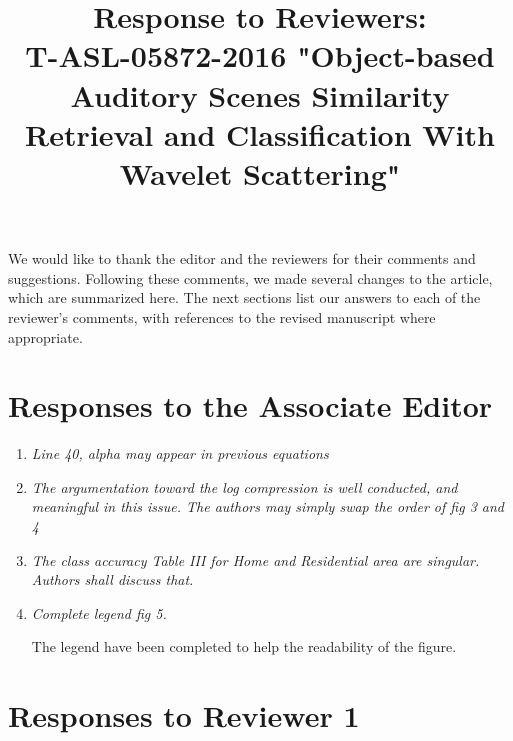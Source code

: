 \documentclass[10pt]{article}
\title{Response to Reviewers: \\ T-ASL-05872-2016 "Object-based Auditory Scenes Similarity Retrieval and Classification With Wavelet Scattering"}
\begin{document}
\maketitle

We would like to thank the editor and the reviewers for their comments and suggestions. Following these comments, we made several changes to the article, which are summarized here. The next sections list our answers to each of the reviewer's comments, with references to the revised manuscript where appropriate.

\section{Responses to the Associate Editor}

\begin{enumerate}

\item \emph{Line 40, alpha may appear in previous equations}

\item \emph{The argumentation toward the log compression is well conducted, and meaningful in this issue. The authors may simply swap the order of fig 3 and 4}

\item \emph{The class accuracy Table III for Home and Residential area are singular. Authors shall discuss that.}

\item \emph{Complete legend fig 5.}

The legend have been completed to help the readability of the figure.

\end{enumerate}

\section{Responses to Reviewer 1}
\end{document}
